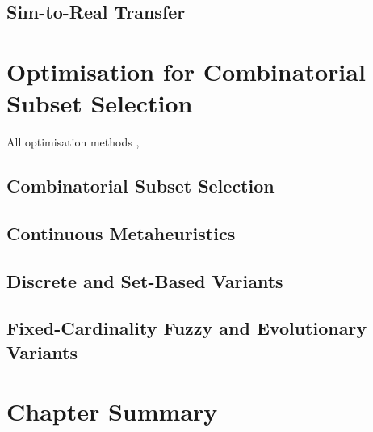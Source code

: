 \subsection{Sim-to-Real Transfer}

\section{Optimisation for Combinatorial Subset Selection}
All optimisation methods
 \cite{jorgensen2018simulation} \cite{olague2002optimal} \cite{zhao2013approximate}, \cite{rahimian2016optimal}

\subsection{Combinatorial Subset Selection}

\subsection{Continuous Metaheuristics}
 \cite{eberhart1995particle}
 \cite{storn1997differential}

\subsection{Discrete and Set-Based Variants}
\cite{van2023set}
\cite{langeveld2015set}

\subsection{Fixed-Cardinality Fuzzy and Evolutionary Variants}
\cite{khan2012fuzzy}
\cite{mohiuddin2016fuzzy}

\section{Chapter Summary}
